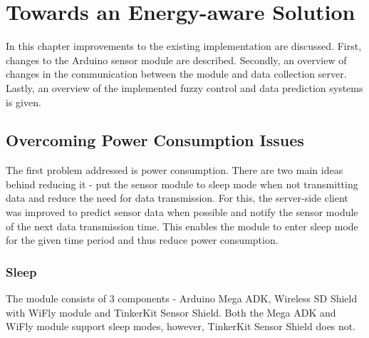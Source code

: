 
\chapter{Towards an Energy-aware Solution} %

In this chapter improvements to the existing implementation are discussed. First, changes to the Arduino sensor module are described. Secondly, an overview of changes in the communication between the module and data collection server. Lastly, an overview of the implemented fuzzy control and data prediction systems is given.


\ifpdf
    \graphicspath{{X/figures/PNG/}{X/figures/PDF/}{X/figures/}}
\else
    \graphicspath{{X/figures/EPS/}{X/figures/}}
\fi

\section{Overcoming Power Consumption Issues}

The first problem addressed is power consumption. There are two main ideas behind reducing it - put the sensor module to sleep mode when not transmitting data and reduce the need for data transmission. For this, the server-side client was improved to predict sensor data when possible and notify the sensor module of the next data transmission time. This enables the module to enter sleep mode for the given time period and thus reduce power consumption. 

\subsection{Sleep}

The module consists of 3 components - Arduino Mega ADK, Wireless SD Shield with WiFly module and TinkerKit Sensor Shield. Both the Mega ADK and WiFly module support sleep modes, however, TinkerKit Sensor Shield does not.

